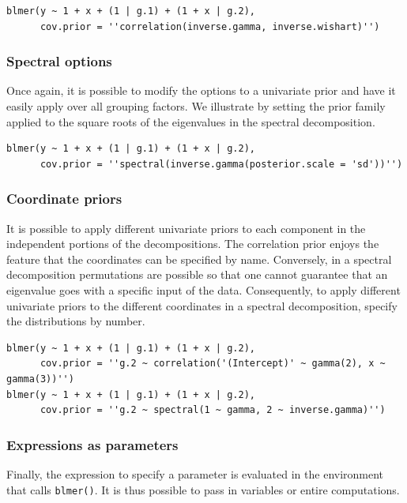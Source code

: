 \documentclass[10pt]{article}
\newcommand{\code}[1]{\texttt{#1}}
\begin{document}
\begin{verbatim}
blmer(y ~ 1 + x + (1 | g.1) + (1 + x | g.2),
      cov.prior = ''correlation(inverse.gamma, inverse.wishart)'')
\end{verbatim}

\subsubsection*{Spectral options}

Once again, it is possible to modify the options to a univariate prior
and have it easily apply over all grouping factors. We illustrate by
setting the prior family applied to the square roots of the eigenvalues in the spectral
decomposition.

\begin{verbatim}
blmer(y ~ 1 + x + (1 | g.1) + (1 + x | g.2),
      cov.prior = ''spectral(inverse.gamma(posterior.scale = 'sd'))'')
\end{verbatim}

\subsubsection*{Coordinate priors}

It is possible to apply different univariate priors to each
component in the independent portions of the decompositions. The
correlation prior enjoys the feature that the coordinates can be
specified by name. Conversely, in a spectral decomposition permutations are
possible so that one cannot guarantee that an eigenvalue goes with a
specific input of the data. Consequently, to apply different
univariate priors to the different coordinates in a spectral decomposition, specify the
distributions by number.

\begin{verbatim}
blmer(y ~ 1 + x + (1 | g.1) + (1 + x | g.2),
      cov.prior = ''g.2 ~ correlation('(Intercept)' ~ gamma(2), x ~ gamma(3))'')
blmer(y ~ 1 + x + (1 | g.1) + (1 + x | g.2),
      cov.prior = ''g.2 ~ spectral(1 ~ gamma, 2 ~ inverse.gamma)'')
\end{verbatim}

\subsubsection*{Expressions as parameters}

Finally, the expression to specify a parameter is evaluated in the
environment that calls \code{blmer()}. It is thus possible to pass in
variables or entire computations.
\end{document}
